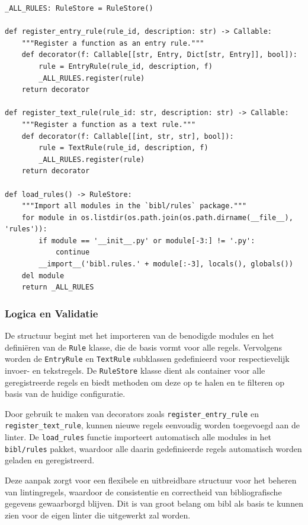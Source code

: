 \begin{verbatim}
_ALL_RULES: RuleStore = RuleStore()

def register_entry_rule(rule_id, description: str) -> Callable:
    """Register a function as an entry rule."""
    def decorator(f: Callable[[str, Entry, Dict[str, Entry]], bool]):
        rule = EntryRule(rule_id, description, f)
        _ALL_RULES.register(rule)
    return decorator

def register_text_rule(rule_id: str, description: str) -> Callable:
    """Register a function as a text rule."""
    def decorator(f: Callable[[int, str, str], bool]):
        rule = TextRule(rule_id, description, f)
        _ALL_RULES.register(rule)
    return decorator

def load_rules() -> RuleStore:
    """Import all modules in the `bibl/rules` package."""
    for module in os.listdir(os.path.join(os.path.dirname(__file__), 'rules')):
        if module == '__init__.py' or module[-3:] != '.py':
            continue
        __import__('bibl.rules.' + module[:-3], locals(), globals())
    del module
    return _ALL_RULES
\end{verbatim}

\subsubsection{Logica en Validatie}

De structuur begint met het importeren van de benodigde modules en het definiëren van de \texttt{Rule} klasse, die de basis vormt voor alle regels. Vervolgens worden de \texttt{EntryRule} en \texttt{TextRule} subklassen gedefinieerd voor respectievelijk invoer- en tekstregels. De \texttt{RuleStore} klasse dient als container voor alle geregistreerde regels en biedt methoden om deze op te halen en te filteren op basis van de huidige configuratie.

Door gebruik te maken van decorators zoals \texttt{register\_entry\_rule} en \texttt{register\-\_text\-\_rule}, kunnen nieuwe regels eenvoudig worden toegevoegd aan de linter. De \texttt{load\_rules} functie importeert automatisch alle modules in het \texttt{bibl/rules} pakket, waardoor alle daarin gedefinieerde regels automatisch worden geladen en geregistreerd.

Deze aanpak zorgt voor een flexibele en uitbreidbare structuur voor het beheren van lintingregels, waardoor de consistentie en correctheid van bibliografische gegevens gewaarborgd blijven. Dit is van groot belang om bibl als basis te kunnen zien voor de eigen linter die uitgewerkt zal worden.

